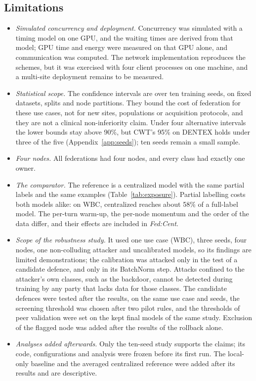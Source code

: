\documentclass[pdflatex,sn-mathphys-num]{sn-jnl}
\newcommand{\fedcent}{\textit{Fed:Cent}}
\begin{document}
\subsection{Limitations}
\begin{itemize}
\item \emph{Simulated concurrency and deployment.} Concurrency was simulated with a timing model on one GPU, and the waiting times are derived from that model; GPU time and energy were measured on that GPU alone, and communication was computed. The network implementation reproduces the schemes, but it was exercised with four client processes on one machine, and a multi-site deployment remains to be measured.
\item \emph{Statistical scope.} The confidence intervals are over ten training seeds, on fixed datasets, splits and node partitions. They bound the cost of federation for these use cases, not for new sites, populations or acquisition protocols, and they are not a clinical non-inferiority claim. Under four alternative intervals the lower bounds stay above 90\%, but CWT's 95\% on DENTEX holds under three of the five (Appendix~\ref{app:seeds}); ten seeds remain a small sample.
\item \emph{Four nodes.} All federations had four nodes, and every class had exactly one owner.
\item \emph{The comparator.} The reference is a centralized model with the same partial labels and the same examples (Table~\ref{tab:exposure}). Partial labelling costs both models alike: on WBC, centralized reaches about 58\% of a full-label model. The per-turn warm-up, the per-node momentum and the order of the data differ, and their effects are included in \fedcent{}.
\item \emph{Scope of the robustness study.} It used one use case (WBC), three seeds, four nodes, one non-colluding attacker and uncalibrated models, so its findings are limited demonstrations; the calibration was attacked only in the test of a candidate defence, and only in its BatchNorm step. Attacks confined to the attacker's own classes, such as the backdoor, cannot be detected during training by any party that lacks data for those classes. The candidate defences were tested after the results, on the same use case and seeds, the screening threshold was chosen after two pilot rules, and the thresholds of peer validation were set on the kept final models of the same study. Exclusion of the flagged node was added after the results of the rollback alone.
\item \emph{Analyses added afterwards.} Only the ten-seed study supports the claims; its code, configurations and analysis were frozen before its first run. The local-only baseline and the averaged centralized reference were added after its results and are descriptive.
\end{itemize}
\end{document}
